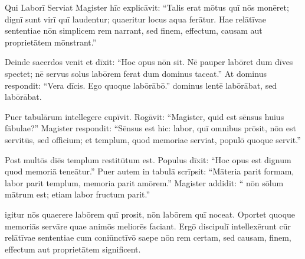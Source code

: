 \documentclass[12pt]{nextbook}
\begin{document}
\begin{readersection}{Qui Laborī Serviat}
Magister hīc explicāvit: “Talis erat mōtus quī nōs monēret; dignī sunt virī quī laudentur; quaeritur locus  aqua ferātur. Hae relātīvae sententiae nōn simplicem rem narrant, sed finem, effectum, causam aut proprietātem mōnstrant.”

Deinde sacerdos venit et dīxit: “Hoc opus  nōn sit. Nē pauper labōret dum dīves spectet; nē servus solus labōrem ferat dum dominus taceat.” At dominus respondit: “Vera dīcis. Ego quoque labōrābō.”  dominus lentē labōrābat, sed labōrābat.

Puer tabulārum  intellegere cupīvit. Rogāvit: “Magister, quid est sēnsus huius fābulae?” Magister respondit: “Sēnsus est hic: labor, quī omnibus prōsit, nōn est servitūs, sed officium; et templum, quod memoriae serviat, populō quoque servit.”

Post multōs diēs templum restitūtum est. Populus dīxit: “Hoc opus est dignum quod memoriā teneātur.” Puer autem in tabulā scrīpsit: “Māteria parit formam, labor parit templum, memoria parit amōrem.” Magister addidit: “ nōn sōlum mātrum est; etiam labor fructum parit.”

 igitur nōs quaerere labōrem quī prosit, nōn labōrem quī noceat. Oportet quoque memoriās servāre quae animōs meliorēs faciant. Ergō discipulī intellexērunt cūr relātīvae sententiae cum coniūnctīvō saepe nōn rem certam, sed causam, finem, effectum aut proprietātem significent.

\end{readersection}
\end{document}
